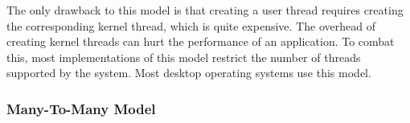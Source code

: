 The only drawback to this model is that creating a user thread requires creating the corresponding kernel thread, which is quite expensive.
The overhead of creating kernel threads can hurt the performance of an application.
To combat this, most implementations of this model restrict the number of threads supported by the system.
Most desktop operating systems use this model.

\subsubsection{Many-To-Many Model}\label{subsubsec:Many_To_Many_Model}

